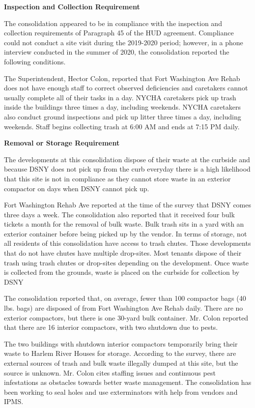 
\textbf{Inspection and Collection Requirement}

The consolidation appeared to be in compliance with the inspection and collection requirements of Paragraph 45 of the HUD agreement. Compliance could not conduct a site visit during the 2019-2020 period; however, in a phone interview conducted in the summer of 2020, the consolidation reported the following conditions.

The Superintendent, Hector Colon, reported that Fort Washington Ave Rehab does not have enough staff to correct observed deficiencies and caretakers cannot usually complete all of their tasks in a day. NYCHA caretakers pick up trash inside the buildings three times a day, including weekends. NYCHA caretakers also conduct ground inspections and pick up litter three times a day, including weekends. Staff begins collecting trash at 6:00 AM and ends at 7:15 PM daily. 

\textbf{Removal or Storage Requirement}

The developments at this consolidation dispose of their waste at the curbside and because DSNY does not pick up from the curb everyday there is a high likelihood that this site is not in compliance as they cannot store waste in an exterior compactor on days when DSNY cannot pick up.

Fort Washington Rehab Ave reported at the time of the survey that DSNY comes three days a week. The consolidation also reported that it received four bulk tickets a month for the removal of bulk waste. Bulk trash sits in a yard with an exterior container before being picked up by the vendor. In terms of storage, not all residents of this consolidation have access to trash chutes. Those developments that do not have chutes have multiple drop-sites. Most tenants dispose of their trash using trash chutes or drop-sites depending on the development. Once waste is collected from the grounds, waste is placed on the curbside for collection by DSNY

The consolidation reported that, on average, fewer than 100 compactor bags (40 lbs. bags) are disposed of from Fort Washington Ave Rehab daily. There are no exterior compactors, but there is one 30-yard bulk container. Mr. Colon reported that there are 16 interior compactors, with two shutdown due to pests. 

The two buildings with shutdown interior compactors temporarily bring their waste to Harlem River Houses for storage. According to the survey, there are external sources of trash and bulk waste illegally dumped at this site, but the source is unknown. Mr. Colon cites staffing issues and continuous pest infestations as obstacles towards better waste management. The consolidation has been working to seal holes and use exterminators with help from vendors and IPMS. 